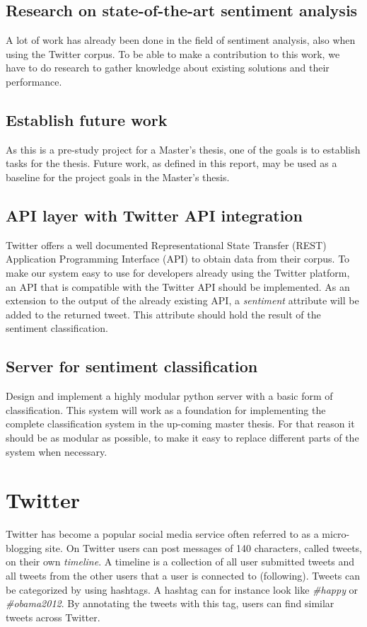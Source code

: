 	\subsection{Research on state-of-the-art sentiment analysis}
	A lot of work has already been done in the field of sentiment analysis, also when using the Twitter corpus. To be able to make a contribution to this work, we have to do research to gather knowledge about existing solutions and their performance.
	
	\subsection{Establish future work}
	As this is a pre-study project for a Master's thesis, one of the goals is to establish tasks for the thesis. Future work, as defined in this report, may be used as a baseline for the project goals in the Master's thesis.
	
	\subsection{API layer with Twitter API integration}
	Twitter offers a well documented Representational State Transfer (REST) Application Programming Interface (API) to obtain data from their corpus. To make our system easy to use for developers already using the Twitter platform, an API that is compatible with the Twitter API should be implemented. As an extension to the output of the already existing API, a \emph{sentiment} attribute will be added to the returned tweet. This attribute should hold the result of the sentiment classification.
	
	\subsection{Server for sentiment classification}
	Design and implement a highly modular python server with a basic form of classification. This system will work as a foundation for implementing the complete classification system in the up-coming master thesis. For that reason it should be as modular as possible, to make it easy to replace different parts of the system when necessary.

	

\section{Twitter}

Twitter has become a popular social media service often referred to as a micro-blogging site. On Twitter users can post messages of 140 characters, called tweets, on their own \emph{timeline}. A timeline is a collection of all user submitted tweets and all tweets from the other users that a user is connected to (following). Tweets can be categorized by using hashtags. A hashtag can for instance look like \emph{\#happy} or \emph{\#obama2012}. By annotating the tweets with this tag, users can find similar tweets across Twitter.

